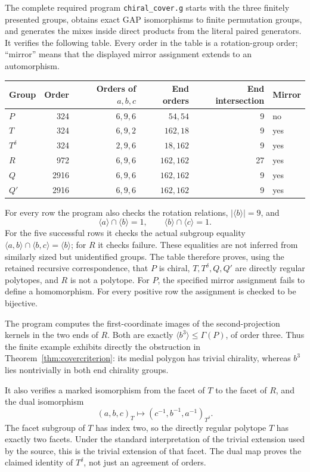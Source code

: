 The complete required program \texttt{chiral\_cover.g} starts with the three finitely presented groups, obtains exact GAP isomorphisms to finite permutation groups, and generates the mixes inside direct products from the literal paired generators. It verifies the following table. Every order in the table is a rotation-group order; ``mirror'' means that the displayed mirror assignment extends to an automorphism.
\begin{center}\small
\begin{tabular}{@{}lrrrrl@{}}\toprule
Group & Order & Orders of $a,b,c$ & End orders & End intersection & Mirror\\\midrule
$P$ &324&$6,9,6$&$54,54$&9&no\\
$T$ &324&$6,9,2$&$162,18$&9&yes\\
$T^\delta$ &324&$2,9,6$&$18,162$&9&yes\\
$R$ &972&$6,9,6$&$162,162$&27&yes\\
$Q$ &2916&$6,9,6$&$162,162$&9&yes\\
$Q'$ &2916&$6,9,6$&$162,162$&9&yes\\\bottomrule
\end{tabular}
\end{center}
For every row the program also checks the rotation relations, $|\langle b\rangle|=9$, and
\[
       \langle a\rangle\cap\langle b\rangle=1,
             \qquad\langle b\rangle\cap\langle c\rangle=1.
\]
For the five successful rows it checks the actual subgroup equality
$\langle a,b\rangle\cap\langle b,c\rangle=\langle b\rangle$; for $R$ it checks failure. These equalities are not inferred from similarly sized but unidentified groups. The table therefore proves, using the retained recursive correspondence, that $P$ is chiral, $T,T^\delta,Q,Q'$ are directly regular polytopes, and $R$ is not a polytope. For $P$, the specified mirror assignment fails to define a homomorphism. For every positive row the assignment is checked to be bijective.

The program computes the first-coordinate images of the second-projection kernels in the two ends of $R$. Both are exactly $\langle b^3\rangle\leq\Gamma(P)$, of order three. Thus the finite example exhibits directly the obstruction in Theorem~\ref{thm:covercriterion}: its medial polygon has trivial chirality, whereas $b^3$ lies nontrivially in both end chirality groups.

It also verifies a marked isomorphism from the facet of $T$ to the facet of $R$, and the dual isomorphism
\[
                (a,b,c)_T\longmapsto(c^{-1},b^{-1},a^{-1})_{T^\delta}.
\]
The facet subgroup of $T$ has index two, so the directly regular polytope $T$ has exactly two facets. Under the standard interpretation of the trivial extension used by the source, this is the trivial extension of that facet. The dual map proves the claimed identity of $T^\delta$, not just an agreement of orders.

